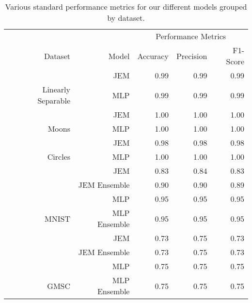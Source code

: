 \begin{table}

\caption{Various standard performance metrics for our different models grouped by dataset. \label{tab:perf} \newline}
\centering
\fontsize{8}{10}\selectfont
\begin{tabular}[t]{rrrrr}
\toprule
\multicolumn{2}{c}{ } & \multicolumn{3}{c}{Performance Metrics} \\
\cmidrule(l{3pt}r{3pt}){3-5}
Dataset & Model & Accuracy & Precision & F1-Score\\
\midrule
 & JEM & 0.99 & 0.99 & 0.99\\

\multirow[t]{-2}{*}{\raggedleft\arraybackslash Linearly Separable} & MLP & 0.99 & 0.99 & 0.99\\
\cmidrule{1-5}
 & JEM & 1.00 & 1.00 & 1.00\\

\multirow[t]{-2}{*}{\raggedleft\arraybackslash Moons} & MLP & 1.00 & 1.00 & 1.00\\
\cmidrule{1-5}
 & JEM & 0.98 & 0.98 & 0.98\\

\multirow[t]{-2}{*}{\raggedleft\arraybackslash Circles} & MLP & 1.00 & 1.00 & 1.00\\
\cmidrule{1-5}
 & JEM & 0.83 & 0.84 & 0.83\\

 & JEM Ensemble & 0.90 & 0.90 & 0.89\\

 & MLP & 0.95 & 0.95 & 0.95\\

\multirow[t]{-4}{*}{\raggedleft\arraybackslash MNIST} & MLP Ensemble & 0.95 & 0.95 & 0.95\\
\cmidrule{1-5}
 & JEM & 0.73 & 0.75 & 0.73\\

 & JEM Ensemble & 0.73 & 0.75 & 0.73\\

 & MLP & 0.75 & 0.75 & 0.75\\

\multirow[t]{-4}{*}{\raggedleft\arraybackslash GMSC} & MLP Ensemble & 0.75 & 0.75 & 0.75\\
\bottomrule
\end{tabular}
\end{table}
